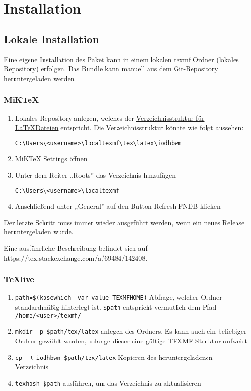 \documentclass[babel=ngerman,highlight=false]{skdoc}
\begin{document}
    \section{Installation}
        \subsection{Lokale Installation}
            Eine eigene Installation des Paket kann in einem lokalen texmf Ordner (lokales Repository) erfolgen. Das Bundle kann manuell aus dem Git-Repository heruntergeladen werden.

            \subsubsection{MiKTeX}
                \begin{enumerate}
                    \item Lokales Repository anlegen, welches der \href{http://tug.ctan.org/tds/tds.html}{Verzeichnisstruktur für \LaTeX Dateien} entspricht. Die Verzeichnisstruktur könnte wie folgt aussehen:\par \verb|C:\Users\<username>\localtexmf\tex\latex\iodhbwm|
                    \item MiKTeX Settings öffnen
                    \item Unter dem Reiter ,,Roots'' das Verzeichnis hinzufügen\par \verb|C:\Users\<username>\localtexmf|
                    \item Anschließend unter ,,General'' auf den Button Refresh FNDB klicken
                \end{enumerate}

                Der letzte Schritt muss immer wieder ausgeführt werden, wenn ein neues Release heruntergeladen wurde.

                Eine ausführliche Beschreibung befindet sich auf \url{https://tex.stackexchange.com/a/69484/142408}.

            \subsubsection{TeXlive}

                \begin{enumerate}
                    \item \verb|path=$(kpsewhich -var-value TEXMFHOME)| Abfrage, welcher Ordner standardmäßig hinterlegt ist. \verb|$path| entspricht vermutlich dem Pfad\\ \verb|/home/<user>/texmf/|
                    \item \verb|mkdir -p $path/tex/latex| anlegen des Ordners. Es kann auch ein beliebiger Ordner gewählt werden, solange dieser eine gültige TEXMF-Struktur aufweist
                    \item \verb|cp -R iodhbwm $path/tex/latex| Kopieren des heruntergeladenen Verzeichnis
                    \item \verb|texhash $path| ausführen, um das Verzeichnis zu aktualisieren
                \end{enumerate}
\end{document}
